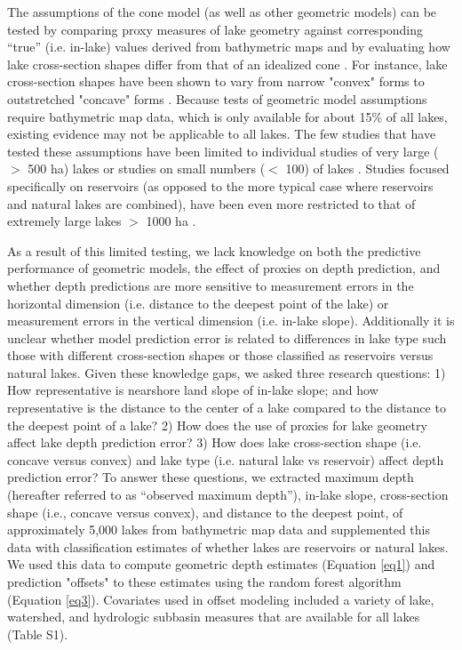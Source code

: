 \documentclass[draft]{agujournal2019}
\begin{document}
The assumptions of the cone model (as well as other geometric models) can be tested by comparing proxy measures of lake geometry against corresponding “true” (i.e. in-lake) values derived from bathymetric maps and by evaluating how lake cross-section shapes differ from that of an idealized cone \cite{johanssonNewApproachesModelling2007}. For instance, lake cross-section shapes have been shown to vary from narrow "convex" forms to outstretched "concave" forms \cite{hakansonLakeFormLake1977}. Because tests of geometric model assumptions require bathymetric map data, which is only available for about 15\% of all lakes, existing evidence may not be applicable to all lakes. The few studies that have tested these assumptions have been limited to individual studies of very large ($>$ 500 ha) lakes or studies on small numbers ($<$ 100) of lakes \cite{johanssonNewApproachesModelling2007}. Studies focused specifically on reservoirs (as opposed to the more typical case where reservoirs and natural lakes are combined), have been even more restricted to that of extremely large lakes $>$ 1000 ha \cite{lehnerHighresolutionMappingWorld2011, messagerEstimatingVolumeAge2016}.

As a result of this limited testing, we lack knowledge on both the predictive performance of geometric models, the effect of proxies on depth prediction, and whether depth predictions are more sensitive to measurement errors in the horizontal dimension (i.e. distance to the deepest point of the lake) or measurement errors in the vertical dimension (i.e. in-lake slope). Additionally it is unclear whether model prediction error is related to differences in lake type such those with different cross-section shapes or those classified as reservoirs versus natural lakes. Given these knowledge gaps, we asked three research questions: 1) How representative is nearshore land slope of in-lake slope; and how representative is the distance to the center of a lake compared to the distance to the deepest point of a lake? 2) How does the use of proxies for lake geometry affect lake depth prediction error? 3) How does lake cross-section shape (i.e. concave versus convex) and lake type (i.e. natural lake vs reservoir) affect depth prediction error? To answer these questions, we extracted maximum depth (hereafter referred to as “observed maximum depth”), in-lake slope, cross-section shape (i.e., concave versus convex), and distance to the deepest point, of approximately 5,000 lakes from bathymetric map data and supplemented this data with classification estimates of whether lakes are reservoirs or natural lakes. We used this data to compute geometric depth estimates (Equation \ref{eq1}) and prediction "offsets" to these estimates using the random forest algorithm (Equation \ref{eq3}). Covariates used in offset modeling included a variety of lake, watershed, and hydrologic subbasin measures that are available for all lakes (Table S1).
\end{document}

